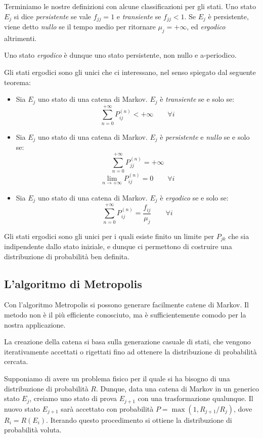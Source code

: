 \documentclass[a4paper,10pt]{article}
\begin{document}
Terminiamo le nostre definizioni con alcune classificazioni per gli stati. Uno stato $E_j$ si dice \emph{persistente} se vale $f_{jj}=1$ e \emph{transiente} se $f_{jj}<1$. Se $E_j$ è persistente, viene detto \emph{nullo} se il tempo medio per ritornare $\mu_j = +\infty$, ed \emph{ergodico} altrimenti.

Uno stato \emph{ergodico} è dunque uno stato persistente, non nullo e a-periodico.

Gli stati ergodici sono gli unici che ci interessano, nel senso spiegato dal seguente teorema:
\begin{itemize}
 \item Sia $E_j$ uno stato di una catena di Markov. $E_j$ è \emph{transiente} se e solo se:
 $$\sum_{n=0}^{+\infty} P^{(n)}_{ij} < +\infty\qquad \forall i$$
 
 \item Sia $E_j$ uno stato di una catena di Markov. $E_j$ è \emph{persistente} e \emph{nullo} se e solo se:
 $$\sum_{n=0}^{+\infty} P^{(n)}_{jj} = +\infty $$
 $$\lim_{n\to+\infty} P^{(n)}_{ij} = 0 \qquad \forall i$$
 
 \item Sia $E_j$ uno stato di una catena di Markov. $E_j$ è \emph{ergodico} se e solo se:
 $$\sum_{n=0}^{+\infty} P^{(n)}_{ij} = \frac{f_{ij}}{\mu_j} \qquad \forall i$$
 
\end{itemize}

Gli stati ergodici sono gli unici per i quali esiste finito un limite per $P_{jk}$ che sia indipendente dallo stato iniziale, e dunque ci permettono di costruire una distribuzione di probabilità ben definita.

\subsection{L'algoritmo di Metropolis}
Con l'algoritmo Metropolis si possono generare facilmente catene di Markov. Il metodo non è il più efficiente conosciuto, ma è sufficientemente comodo per la nostra applicazione.

La creazione della catena si basa sulla generazione casuale di stati, che vengono iterativamente accettati o rigettati fino ad ottenere la distribuzione di probabilità cercata.

Supponiamo di avere un problema fisico per il quale si ha bisogno di una distribuzione di probabilità $R$. Dunque, data una catena di Markov in un generico stato $E_j$, creiamo uno stato di prova $E_{j+1}$ con una trasformazione qualunque.
Il nuovo stato $E_{j+1}$ sarà accettato con probabilità $P = \max(1, R_{j+1}/R_j)$, dove $R_i = R(E_i)$. Iterando questo procedimento si ottiene la distribuzione di probabilità voluta.
\end{document}
